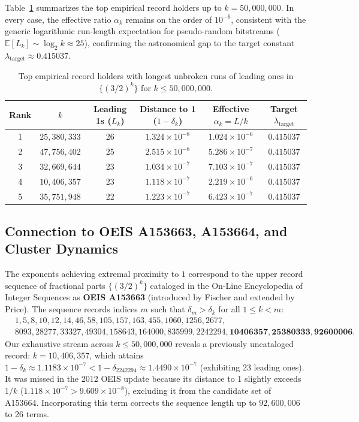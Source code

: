 \documentclass[11pt,reqno]{amsart}
\theoremstyle{definition}
\numberwithin{equation}{section}
\begin{document}
Table~\ref{tab:records} summarizes the top empirical record holders up to $k = 50{,}000{,}000$. In every case, the effective ratio $\alpha_k$ remains on the order of $10^{-6}$, consistent with the generic logarithmic run-length expectation for pseudo-random bitstreams ($\mathbb{E}[L_k] \sim \log_2 k \approx 25$), confirming the astronomical gap to the target constant $\lambda_{\mathrm{target}} \approx 0.415037$.

\begin{table}[htbp]
\centering
\small
\begin{tabular}{cccccc}
\toprule
\textbf{Rank} & $k$ & \textbf{Leading 1s ($L_k$)} & \textbf{Distance to 1 ($1 - \delta_k$)} & \textbf{Effective $\alpha_k = L/k$} & \textbf{Target $\lambda_{\mathrm{target}}$} \\
\midrule
1 & $25{,}380{,}333$ & 26 & $1.324 \times 10^{-8}$ & $1.024 \times 10^{-6}$ & $0.415037$ \\
2 & $47{,}756{,}402$ & 25 & $2.515 \times 10^{-8}$ & $5.286 \times 10^{-7}$ & $0.415037$ \\
3 & $32{,}669{,}644$ & 23 & $1.034 \times 10^{-7}$ & $7.103 \times 10^{-7}$ & $0.415037$ \\
4 & $10{,}406{,}357$ & 23 & $1.118 \times 10^{-7}$ & $2.219 \times 10^{-6}$ & $0.415037$ \\
5 & $35{,}751{,}948$ & 22 & $1.223 \times 10^{-7}$ & $6.423 \times 10^{-7}$ & $0.415037$ \\
\bottomrule
\end{tabular}
\caption{Top empirical record holders with longest unbroken runs of leading ones in $\{(3/2)^k\}$ for $k \le 50{,}000{,}000$.}\label{tab:records}
\end{table}

\subsection{Connection to OEIS A153663, A153664, and Cluster Dynamics}\label{sec:oeis_clusters}

The exponents achieving extremal proximity to $1$ correspond to the upper record sequence of fractional parts $\{(3/2)^k\}$ cataloged in the On-Line Encyclopedia of Integer Sequences as \textbf{OEIS A153663} \cite{oeisA153663} (introduced by Fischer and extended by Price). The sequence records indices $m$ such that $\delta_m > \delta_k$ for all $1 \le k < m$:
\begin{align*}
& 1, 5, 8, 10, 12, 14, 46, 58, 105, 157, 163, 455, 1060, 1256, 2677, \\
& 8093, 28277, 33327, 49304, 158643, 164000, 835999, 2242294, \mathbf{10406357}, \mathbf{25380333}, \mathbf{92600006}.
\end{align*}
Our exhaustive stream across $k \le 50{,}000{,}000$ reveals a previously uncataloged record: \textbf{$k = 10{,}406{,}357$}, which attains $1 - \delta_k \approx 1.1183 \times 10^{-7} < 1 - \delta_{2242294} \approx 1.4490 \times 10^{-7}$ (exhibiting 23 leading ones). It was missed in the 2012 OEIS update because its distance to 1 slightly exceeds $1/k$ ($1.118 \times 10^{-7} > 9.609 \times 10^{-8}$), excluding it from the candidate set of A153664. Incorporating this term corrects the sequence length up to $92{,}600{,}006$ to 26 terms.
\end{document}
